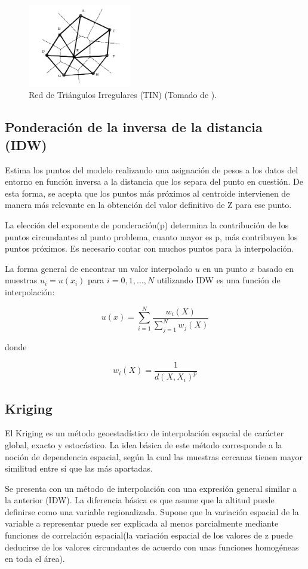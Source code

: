 \begin{figure}
\centering
\includegraphics[width=0.4\textwidth]{capitulo-2/graphics/TIN-cPachecoMDE2003.png}
\caption{\label{fig:sig-tin}Red de Triángulos Irregulares (TIN) (Tomado de \cite{cPachecoMDE2003}).}
\end{figure}


\subsection{Ponderación de la inversa de la distancia (IDW)}
Estima los puntos del modelo realizando una asignación de pesos a los datos del entorno en función inversa a la
distancia que los separa del punto en cuestión. De esta forma, se acepta que los puntos más próximos al centroide
intervienen de manera más relevante en la obtención del valor definitivo de Z para ese punto.

La elección del exponente de ponderación(p) determina la contribución de los puntos circundantes al punto 
problema, cuanto mayor es p, más contribuyen los puntos próximos. Es necesario contar con muchos puntos para la
interpolación.

La forma general de encontrar un valor interpolado $u$ en un punto $x$ basado en muestras $u_i = u (x_i)$ para 
$i = 0,1, ..., N$ utilizando IDW es una función de interpolación:

\begin{equation}\label{eq:interpolacion-idw}
 u(x) = \sum_{i=1}^{N} \frac{w_i(X)}{\sum_{j=1}^{N} w_j(X)}
\end{equation}

donde 

\begin{equation} 
w_i(X) =  \frac{1}{d(X, X_i)^p} 
\end{equation}

\subsection{Kriging}
El Kriging es un método geoestadístico de interpolación espacial de carácter global, exacto y estocástico. La 
idea básica de este método corresponde a la noción de dependencia espacial, según la cual las muestras cercanas
tienen mayor similitud entre sí que las más apartadas\cite{NINO2011}.

Se presenta con un método de interpolación con una expresión general similar a la anterior (IDW). La diferencia
básica es que asume que la altitud puede definirse como una variable regionalizada. Supone que la variación
espacial de la variable a representar puede ser explicada al menos parcialmente mediante funciones de correlación
espacial(la variación espacial de los valores de z puede deducirse de los valores circundantes de acuerdo con unas
funciones homogéneas en toda el área).
